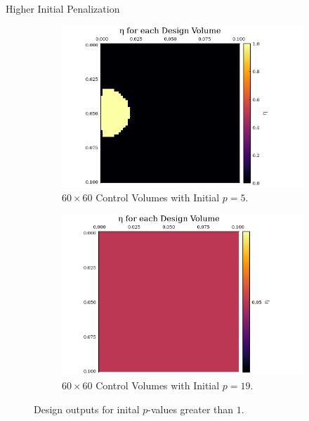 \documentclass[final]{beamer}
\begin{document}
\begin{frame}{Higher Initial Penalization}
	\begin{figure}
		\begin{subfigure}{0.45\textwidth}
			\includegraphics[width=1.1\linewidth]{60x60-start-p=5-1iters.png}
			\caption{$60\times 60$ Control Volumes with Initial $p=5$.}
			\label{fig:start_p=5}
		\end{subfigure}
		\begin{subfigure}{0.45\textwidth}
			\includegraphics[width=1.1\linewidth]{60x60-start-p=19-3iters.png}
			\caption{$60\times 60$ Control Volumes with Initial $p=19$.}
			\label{fig:start_p=19}
		\end{subfigure}
		\caption[Designs with Higher Initial $p$]{Design outputs for inital $p$-values greater than $1$.}
	\end{figure}
\end{frame}
\end{document}

